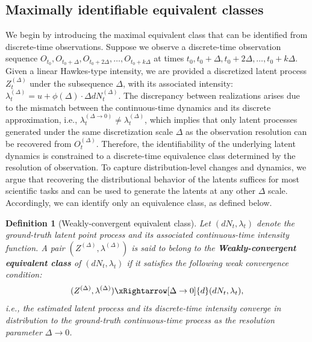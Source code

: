 \documentclass[10pt]{article}
\numberwithin{figure}{section}
\newtheorem{definition}{Definition}
\begin{document}
\subsection{Maximally identifiable equivalent classes }\label{4.1}

We begin by introducing the maximal equivalent class that can be identified from discrete-time observations. Suppose we observe a discrete-time observation sequence \(O_{t_0}, O_{t_0+\Delta}, O_{t_0+2\Delta}, \ldots, O_{t_0+k\Delta}\) at times $t_0, t_0+\Delta, t_0+2\Delta, \ldots, t_0+k\Delta$. Given a linear Hawkes-type intensity, we are provided a discretized latent process \( Z_t^{(\Delta)} \) under the subsequence \( \Delta \), with its associated intensity: $\lambda_t^{(\Delta)} = u + \phi(\Delta) \cdot \Delta dN_t^{(\Delta)}$. The discrepancy between realizations arises due to the mismatch between the continuous-time dynamics and its discrete approximation, i.e., $\lambda_t^{(\Delta \to 0)} \neq \lambda_t^{(\Delta)}$, which implies that only latent processes generated under the same discretization scale \( \Delta \) as the observation resolution can be recovered from \( O_t^{(\Delta)} \). Therefore, the identifiability of the underlying latent dynamics is constrained to a discrete-time equivalence class determined by the resolution of observation. To capture distribution-level changes and dynamics, we argue that recovering the distributional behavior of the latents suffices for most scientific tasks and can be used to generate the latents at any other $\Delta$ scale. Accordingly, we can identify only an equivalence class, as defined below.

\begin{definition}[Weakly-convergent equivalent class]\label{maindef_cw}
Let \( (dN_t, \lambda_t) \) denote the ground-truth latent point process and its associated continuous-time intensity function. A pair \( (Z^{(\Delta)}, \lambda^{(\Delta)}) \) is said to belong to the \textbf{Weakly-convergent equivalent class} of \( (dN_t, \lambda_t) \) if it satisfies the following weak convergence condition:
\[
(Z^{(\Delta)}, \lambda^{(\Delta)}) \xRightarrow[\Delta \to 0]{d} (dN_t, \lambda_t),
\]
i.e., the estimated latent process and its discrete-time intensity converge in distribution to the ground-truth continuous-time process as the resolution parameter \( \Delta \to 0 \).  
\end{definition}
\end{document}
